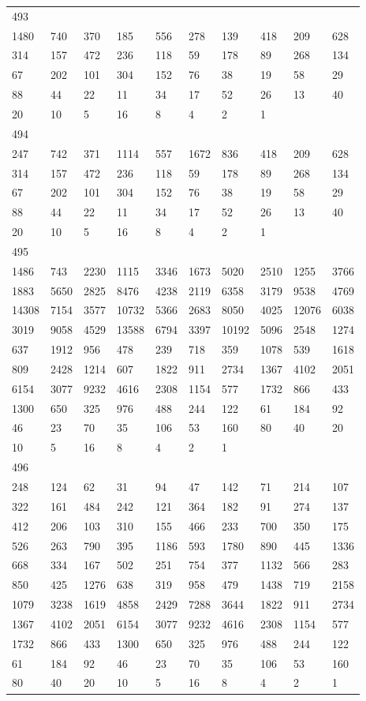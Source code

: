 \begin{longtable}{*{10}{l}}
493&&&&&&&&&\\
1480& 740& 370& 185& 556& 278& 139& 418& 209& 628\\
314& 157& 472& 236& 118& 59& 178& 89& 268& 134\\
67& 202& 101& 304& 152& 76& 38& 19& 58& 29\\
88& 44& 22& 11& 34& 17& 52& 26& 13& 40\\
20& 10& 5& 16& 8& 4& 2& 1& \\

494&&&&&&&&&\\
247& 742& 371& 1114& 557& 1672& 836& 418& 209& 628\\
314& 157& 472& 236& 118& 59& 178& 89& 268& 134\\
67& 202& 101& 304& 152& 76& 38& 19& 58& 29\\
88& 44& 22& 11& 34& 17& 52& 26& 13& 40\\
20& 10& 5& 16& 8& 4& 2& 1& \\

495&&&&&&&&&\\
1486& 743& 2230& 1115& 3346& 1673& 5020& 2510& 1255& 3766\\
1883& 5650& 2825& 8476& 4238& 2119& 6358& 3179& 9538& 4769\\
14308& 7154& 3577& 10732& 5366& 2683& 8050& 4025& 12076& 6038\\
3019& 9058& 4529& 13588& 6794& 3397& 10192& 5096& 2548& 1274\\
637& 1912& 956& 478& 239& 718& 359& 1078& 539& 1618\\
809& 2428& 1214& 607& 1822& 911& 2734& 1367& 4102& 2051\\
6154& 3077& 9232& 4616& 2308& 1154& 577& 1732& 866& 433\\
1300& 650& 325& 976& 488& 244& 122& 61& 184& 92\\
46& 23& 70& 35& 106& 53& 160& 80& 40& 20\\
10& 5& 16& 8& 4& 2& 1& \\

496&&&&&&&&&\\
248& 124& 62& 31& 94& 47& 142& 71& 214& 107\\
322& 161& 484& 242& 121& 364& 182& 91& 274& 137\\
412& 206& 103& 310& 155& 466& 233& 700& 350& 175\\
526& 263& 790& 395& 1186& 593& 1780& 890& 445& 1336\\
668& 334& 167& 502& 251& 754& 377& 1132& 566& 283\\
850& 425& 1276& 638& 319& 958& 479& 1438& 719& 2158\\
1079& 3238& 1619& 4858& 2429& 7288& 3644& 1822& 911& 2734\\
1367& 4102& 2051& 6154& 3077& 9232& 4616& 2308& 1154& 577\\
1732& 866& 433& 1300& 650& 325& 976& 488& 244& 122\\
61& 184& 92& 46& 23& 70& 35& 106& 53& 160\\
80& 40& 20& 10& 5& 16& 8& 4& 2& 1\\


\end{longtable}

